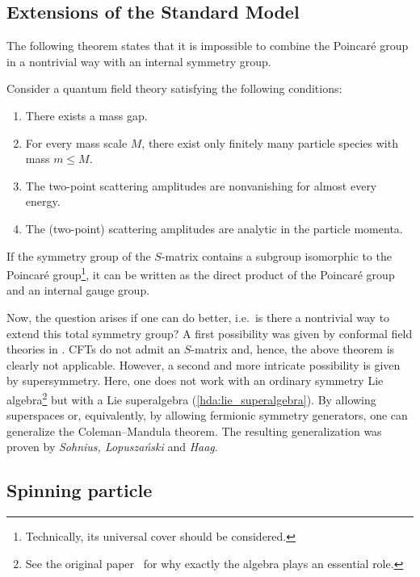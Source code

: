 \subsection{Extensions of the Standard Model}

    The following theorem states that it is impossible to combine the Poincar\'e group in a nontrivial way with an internal symmetry group.
    \begin{theorem}
        Consider a quantum field theory satisfying the following conditions:
        \begin{enumerate}
            \item There exists a mass gap.
            \item For every mass scale $M$, there exist only finitely many particle species with mass $m\leq M$.
            \item The two-point scattering amplitudes are nonvanishing for almost every energy.
            \item The (two-point) scattering amplitudes are analytic in the particle momenta.
        \end{enumerate}
        If the symmetry group of the $S$-matrix contains a subgroup isomorphic to the Poincar\'e group\footnote{Technically, its universal cover should be considered.}, it can be written as the direct product of the Poincar\'e group and an internal gauge group.
    \end{theorem}

    Now, the question arises if one can do better, i.e.~is there a nontrivial way to extend this total symmetry group? A first possibility was given by conformal field theories in . CFTs do not admit an $S$-matrix and, hence, the above theorem is clearly not applicable. However, a second and more intricate possibility is given by supersymmetry. Here, one does not work with an ordinary symmetry Lie algebra\footnote{See the original paper~\citet{coleman_all_1967} for why exactly the algebra plays an essential role.} but with a Lie superalgebra (\cref{hda:lie_superalgebra}). By allowing superspaces or, equivalently, by allowing fermionic symmetry generators, one can generalize the Coleman--Mandula theorem. The resulting generalization was proven by \textit{Sohnius, Lopusza\'nski} and \textit{Haag}.

\subsection{Spinning particle}

